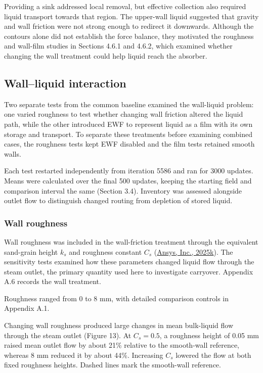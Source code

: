 \documentclass[12pt]{article}
\begin{document}
Providing a sink addressed local removal, but effective collection also required liquid transport towards that region. The upper-wall liquid suggested that gravity and wall friction were not strong enough to redirect it downwards. Although the contours alone did not establish the force balance, they motivated the roughness and wall-film studies in Sections 4.6.1 and 4.6.2, which examined whether changing the wall treatment could help liquid reach the absorber.

\subsection{Wall--liquid interaction}\label{wallliquid-interaction}

Two separate tests from the common baseline examined the wall-liquid problem: one varied roughness to test whether changing wall friction altered the liquid path, while the other introduced EWF to represent liquid as a film with its own storage and transport. To separate these treatments before examining combined cases, the roughness tests kept EWF disabled and the film tests retained smooth walls.

Each test restarted independently from iteration 5586 and ran for 3000 updates. Means were calculated over the final 500 updates, keeping the starting field and comparison interval the same (Section 3.4). Inventory was assessed alongside outlet flow to distinguish changed routing from depletion of stored liquid.

\subsubsection{Wall roughness}\label{wall-roughness}

Wall roughness was included in the wall-friction treatment through the equivalent sand-grain height \(k_s\) and roughness constant \(C_s\) (\href{https://ansyshelp.ansys.com/public/Views/Secured/corp/v252/en/flu_th/x1-5720008.164.html}{Ansys, Inc., 2025k}). The sensitivity tests examined how these parameters changed liquid flow through the steam outlet, the primary quantity used here to investigate carryover. Appendix A.6 records the wall treatment.

Roughness ranged from 0 to 8 mm, with detailed comparison controls in Appendix A.1.

Changing wall roughness produced large changes in mean bulk-liquid flow through the steam outlet (Figure 13). At \(C_s=0.5\), a roughness height of 0.05 mm raised mean outlet flow by about 21\% relative to the smooth-wall reference, whereas 8 mm reduced it by about 44\%. Increasing \(C_s\) lowered the flow at both fixed roughness heights. Dashed lines mark the smooth-wall reference.
\end{document}
